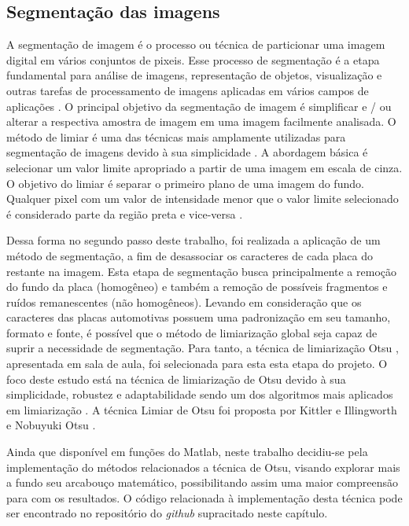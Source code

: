 \documentclass[
	12pt,				%
    oneside,			%
	a4paper,			%
	english,			%
	french,				%
	spanish,			%
	brazil,				%
	]{abntex2}
\begin{document}
\subsection{Segmentação das imagens}

A segmentação de imagem é o processo ou técnica de particionar uma imagem digital em vários conjuntos de pixeis. Esse processo de segmentação é a etapa fundamental para análise de imagens, representação de objetos, visualização e outras tarefas de processamento de imagens aplicadas em vários campos de aplicações \cite{kumar2013}. O principal objetivo da segmentação de imagem é simplificar e / ou alterar a respectiva amostra de imagem em uma imagem facilmente analisada. O método de limiar é uma das técnicas mais amplamente utilizadas para segmentação de imagens devido à sua simplicidade \cite{sahoo1988}. A abordagem básica é selecionar um valor limite apropriado a partir de uma imagem em escala de cinza. O objetivo do limiar é separar o primeiro plano de uma imagem do fundo. Qualquer pixel com um valor de intensidade menor que o valor limite selecionado é considerado parte da região preta e vice-versa \cite{abutaleb1989}.

Dessa forma no segundo passo deste trabalho, foi realizada a aplicação de um método de segmentação, a fim de desassociar os caracteres de cada placa do restante na imagem. Esta etapa de segmentação busca principalmente a remoção do fundo da placa (homogêneo) e também a remoção de possíveis fragmentos e ruídos remanescentes (não homogêneos). Levando em consideração que os caracteres das placas automotivas possuem uma padronização em seu tamanho, formato e fonte, é possível que o método de limiarização global seja capaz de suprir a necessidade de segmentação. Para tanto, a técnica de limiarização Otsu \cite{otsu1979,zhang2008image}, apresentada em sala de aula, foi selecionada para esta esta etapa do projeto. O foco deste estudo está na técnica de limiarização de Otsu devido à sua simplicidade, robustez e adaptabilidade sendo um dos algoritmos mais aplicados
em limiarização \cite{otsu1979}. A técnica Limiar de Otsu foi proposta por Kittler e Illingworth \cite{kittler1986} e Nobuyuki Otsu \cite{otsu1979}.

Ainda que disponível em funções do Matlab, neste trabalho decidiu-se pela implementação do métodos relacionados a técnica de Otsu, visando explorar mais a fundo seu arcabouço matemático, possibilitando assim uma maior compreensão para com os resultados. O código relacionada à implementação desta técnica pode ser encontrado no repositório do \textit{github} supracitado neste capítulo.
 
\end{document}
